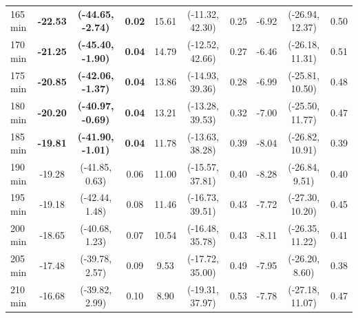 \begin{table}[ht]
{\begin{tabular}{lccccccccc}
165 min & \textbf{-22.53} & \textbf{(-44.65, -2.74)} & \textbf{0.02} & 15.61 & (-11.32, 42.30) & 0.25 & -6.92 & (-26.94, 12.37) & 0.50 \\
170 min & \textbf{-21.25} & \textbf{(-45.40, -1.90)} & \textbf{0.04} & 14.79 & (-12.52, 42.66) & 0.27 & -6.46 & (-26.18, 11.31) & 0.51 \\
175 min & \textbf{-20.85} & \textbf{(-42.06, -1.37)} & \textbf{0.04} & 13.86 & (-14.93, 39.36) & 0.28 & -6.99 & (-25.81, 10.50) & 0.48 \\
180 min & \textbf{-20.20} & \textbf{(-40.97, -0.69)} & \textbf{0.04} & 13.21 & (-13.28, 39.53) & 0.32 & -7.00 & (-25.50, 11.77) & 0.47 \\
185 min & \textbf{-19.81} & \textbf{(-41.90, -1.01)} & \textbf{0.04} & 11.78 & (-13.63, 38.28) & 0.39 & -8.04 & (-26.82, 10.91) & 0.39 \\
190 min & -19.28 & (-41.85, 0.63) & 0.06 & 11.00 & (-15.57, 37.81) & 0.40 & -8.28 & (-26.84, 9.51) & 0.40 \\
195 min & -19.18 & (-42.44, 1.48) & 0.08 & 11.46 & (-16.73, 39.51) & 0.43 & -7.72 & (-27.30, 10.20) & 0.45 \\
200 min & -18.65 & (-40.68, 1.23) & 0.07 & 10.54 & (-16.48, 35.78) & 0.43 & -8.11 & (-26.35, 11.22) & 0.41 \\
205 min & -17.48 & (-39.78, 2.57) & 0.09 & 9.53 & (-17.72, 35.00) & 0.49 & -7.95 & (-26.20, 8.60) & 0.38 \\
210 min & -16.68 & (-39.82, 2.99) & 0.10 & 8.90 & (-19.31, 37.97) & 0.53 & -7.78 & (-27.18, 11.07) & 0.47 \\
\bottomrule
\end{tabular}%
}
\end{table}
